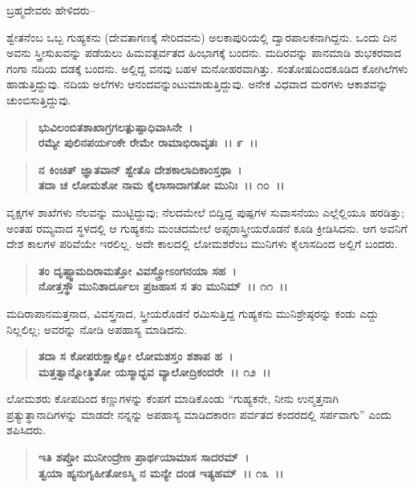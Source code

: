 \begin{flushleft}
 ಬ್ರಹ್ಮದೇವರು ಹೇಳಿದರು–
\end{flushleft}

ಶ್ವೇತನೆಂಬ ಒಬ್ಬ ಗುಹ್ಯಕನು (ದೇವತಾಗಣಕ್ಕೆ ಸೇರಿದವನು) ಅಲಕಾಪುರಿಯಲ್ಲಿ ದ್ವಾರಪಾಲಕನಾಗಿದ್ದನು. ಒಂದು ದಿನ ಅವನು ಸ್ತ್ರೀಸುಖವನ್ನು ಪಡೆಯಲು ಹಿಮವತ್ಪರ್ವತದ ಹಿಂಭಾಗಕ್ಕೆ ಬಂದನು. ಮದಿರವನ್ನು ಪಾನಮಾಡಿ ಶುಭಕರವಾದ ಗಂಗಾ ನದಿಯ ದಡಕ್ಕೆ ಬಂದನು. ಅಲ್ಲಿದ್ದ ವನವು ಬಹಳ ಮನೋಹರವಾಗಿತ್ತು. ಸಂತೋಷದಿಂದಕೂಡಿದ ಕೋಗಿಲೆಗಳು ಹಾಡುತ್ತಿದ್ದುವು. ನದಿಯ ಅಲೆಗಳು ಆನಂದವನ್ನುಂಟುಮಾಡುತ್ತಿದ್ದುವು. ಅನೇಕ ವಿಧವಾದ ಮರಗಳು ಆಕಾಶವನ್ನು ಚುಂಬಿಸುತ್ತಿದ್ದುವು.

\begin{verse}
\textbf{ಭುವಿಲಂಬಿತಶಾಖಾಗ್ರಗಲತ್ಪುಷ್ಪಾಧಿವಾಸಿನೇ~।}\\\textbf{ರಮ್ಯೇ ಪುಲಿನಪರ್ಯಂಕೇ ರೇಮೇ ರಾಮಾಭಿರಾವೃತಃ~।। ೯~।। }
\end{verse}

\begin{verse}
\textbf{ನ ಕಿಂಚಿತ್ ಜ್ಞಾತವಾನ್ ಶ್ವೇತೊ ದೇಶಕಾಲಾದಿಕಾಂಸ್ತಥಾ~।}\\\textbf{ತದಾ ಚ ಲೋಮಶೋ ನಾಮ ಕೈಲಾಸಾದಾಗತೋ ಮುನಿಃ~।। ೧೦~।।}
\end{verse}

ವೃಕ್ಷಗಳ ಶಾಖೆಗಳು ನೆಲವನ್ನು ಮುಟ್ಟಿದ್ದುವು; ನೆಲದಮೇಲೆ ಬಿದ್ದಿದ್ದ ಪುಷ್ಪಗಳ ಸುವಾಸನೆಯು ಎಲ್ಲೆಲ್ಲಿಯೂ ಹರಡಿತ್ತು; ಅಂತಹ ರಮ್ಯವಾದ ಸ್ಥಳದಲ್ಲಿ ಆ ಗುಹ್ಯಕನು ಮಂಚದಮೇಲೆ ಅಪ್ಸರಾಸ್ತ್ರೀಯರೊಡನೆ ಕೂಡಿ ಕ್ರೀಡಿಸಿದನು. ಆಗ ಅವನಿಗೆ ದೇಶ ಕಾಲಗಳ ಪರಿವೆಯೇ ಇರಲಿಲ್ಲ. ಅದೇ ಕಾಲದಲ್ಲಿ ಲೋಮಶರೆಂಬ ಮುನಿಗಳು ಕೈಲಾಸದಿಂದ ಅಲ್ಲಿಗೆ ಬಂದರು.

\begin{verse}
\textbf{ತಂ ದೃಷ್ಟ್ವಾಮದಿರಾಮತ್ತೋ ವಿವಸ್ತ್ರೋಽಂಗನಯಾ ಸಹ~।}\\\textbf{ನೋತ್ತಸ್ಥೌ ಮುನಿಶಾರ್ದೂಲಃ ಪ್ರಜಹಾಸ ಸ ತಂ ಮುನಿಮ್~।। ೧೧~।।}
\end{verse}

ಮದಿರಾಪಾನಮತ್ತನಾದ, ವಿವಸ್ತ್ರನಾದ, ಸ್ತ್ರೀಯರೊಡನೆ ರಮಿಸುತ್ತಿದ್ದ ಗುಹ್ಯಕನು ಮುನಿಶ್ರೇಷ್ಠರನ್ನು ಕಂಡು ಎದ್ದು ನಿಲ್ಲಲಿಲ್ಲ; ಅವರನ್ನು ನೋಡಿ ಅಪಹಾಸ್ಯ ಮಾಡಿದನು.

\begin{verse}
\textbf{ತದಾ ಸ ಕೋಪರುಕ್ಷಾಕ್ಷೋ ಲೋಮಶಸ್ತಂ ಶಶಾಪ ಹ~।}\\\textbf{ಮತ್ತತ್ವಾನ್ನೋತ್ಥಿತೋ ಯಸ್ಮಾದ್ಭವ ವ್ಯಾಲೋದ್ರಿಕಂದರೇ~।। ೧೨~।।}
\end{verse}

ಲೋಮಶರು ಕೋಪದಿಂದ ಕಣ್ಣುಗಳನ್ನು ಕೆಂಪಗೆ ಮಾಡಿಕೊಂಡು “ಗುಹ್ಯಕನೇ, ನೀನು ಉನ್ಮತ್ತನಾಗಿ ಪ್ರತ್ಯುತ್ಥಾನಾದಿಗಳನ್ನು ಮಾಡದೇ ನನ್ನನ್ನು ಅಪಹಾಸ್ಯ ಮಾಡಿದಕಾರಣ ಪರ್ವತದ ಕಂದರದಲ್ಲಿ ಸರ್ಪವಾಗು” ಎಂದು ಶಪಿಸಿದರು.

\begin{verse}
\textbf{ಇತಿ ಶಪ್ತೋ ಮುನೀಂದ್ರೇಣ ಪ್ರಾರ್ಥಯಾಮಾಸ ಸಾದರಮ್~।}\\\textbf{ತ್ವಯಾ ಹ್ಯನುಗೃಹೀತೋಽಸ್ಮಿ ನ ಮನ್ಯೇ ದಂಡ ಇತ್ಯಹಮ್~।। ೧೩~।।}
\end{verse}

